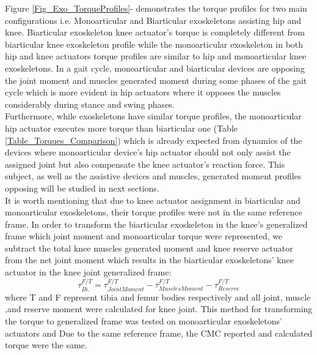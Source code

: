 \documentclass[10pt,letterpaper]{article}
\begin{document}
Figure \ref{Fig_Exo_TorqueProfiles}- demonstrates the torque profiles for two main configurations i.e. Monoarticular and Biarticular exoskeletons assisting hip and knee. Biarticular exoskeleton knee actuator's torque is completely different from biarticular knee exoskeleton profile while the monoarticular exoskeleton in both hip and knee actuators torque profiles are similar to hip and monoarticular knee exoskeletons.
In a gait cycle, monoarticular and biarticular devices are opposing the joint moment and muscles generated moment during some phases of the gait cycle which is more evident in hip actuators where it opposes the muscles considerably during stance and swing phases.\\
Furthermore, while exoskeletons have similar torque profiles, the monoarticular hip actuator executes more torque than biarticular one (Table \ref{Table_Torques_Comparison}) which is already expected from dynamics of the devices where monoarticular device's hip actuator should not only assist the assigned joint but also compensate the knee actuator's reaction force. This subject, as well as the assistive devices and muscles, generated moment profiles opposing will be studied in next sections.\\
It is worth mentioning that due to knee actuator assignment in biarticular and monoarticular exoskeletons, their torque profiles were not in the same reference frame. In order to transform the biarticular exoskeleton in the knee's generalized frame which joint moment and monoarticular torque were represented, we subtract the total knee muscles generated moment and knee reserve actuator from the net joint moment which results in the biarticular exoskeletons' knee actuator in the knee joint generalized frame:
\begin{equation}
\tau^{F/T}_{Bi.} = \tau^{F/T}_{Joint Moment} - \tau^{F/T}_{Muscles Moment} -  \tau^{F/T}_{Reserve}
\label{Eqn_Frame_Transformation}
\end{equation}
where T and F represent tibia and femur bodies respectively and all joint, muscle ,and reserve moment were calculated for knee joint. This method for transforming the torque to generalized frame was tested on monoarticular exoskeletons' actuators and Due to the same reference frame, the CMC reported and calculated torque were the same.\\
\end{document}
